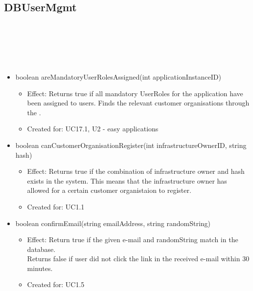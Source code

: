   \subsection{DBUserMgmt}\label{int:OtherDataDatabaseOtherDataDBDBUserMgmt}
    \begin{description}
      \item[Provided by:] \iconcomponent{}~
      \item[Required by:] \iconcomponent{}~
      \item[Operations:] ~
    \begin{itemize}[noitemsep,nolistsep,leftmargin=-.25cm]
      \item \textsf{boolean areMandatoryUserRolesAssigned(int applicationInstanceID)}
        \begin{itemize}[noitemsep,nolistsep]
           \item Effect: Returns true if all mandatory UserRoles for the application have been assigned to users. Finds the relevant customer organisations through the .
\item Created for: UC17.1, U2 - easy applications
        \end{itemize}
      \item \textsf{boolean canCustomerOrganisationRegister(int infrastructureOwnerID, string hash)}
        \begin{itemize}[noitemsep,nolistsep]
           \item Effect: Returns true if the combination of infrastructure owner and hash exists in the system. This means that the infrastructure owner has allowed for a certain customer organistaion to register.
\item Created for: UC1.1
        \end{itemize}
      \item \textsf{boolean confirmEmail(string emailAddress, string randomString)}
        \begin{itemize}[noitemsep,nolistsep]
           \item Effect: Return true if the given e-mail and randomString match in the database. \\
Returns false if user did not click the link in the received e-mail within 30 minutes.
\item Created for: UC1.5
        \end{itemize}

\end{itemize}
\end{description}
